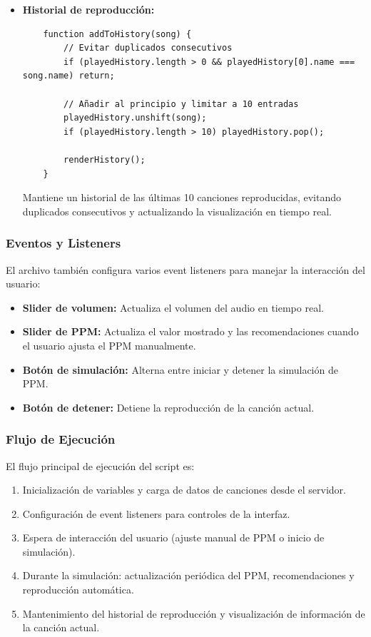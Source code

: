 \documentclass[a4paper,12pt]{article}
\begin{document}
\begin{itemize}
    \item \textbf{Historial de reproducción:}
    \begin{verbatim}
    function addToHistory(song) {
        // Evitar duplicados consecutivos
        if (playedHistory.length > 0 && playedHistory[0].name === song.name) return;
        
        // Añadir al principio y limitar a 10 entradas
        playedHistory.unshift(song);
        if (playedHistory.length > 10) playedHistory.pop();
        
        renderHistory();
    }
    \end{verbatim}
    Mantiene un historial de las últimas 10 canciones reproducidas, evitando duplicados consecutivos y actualizando la visualización en tiempo real.
\end{itemize}

\subsubsection{Eventos y Listeners}
El archivo también configura varios event listeners para manejar la interacción del usuario:

\begin{itemize}
    \item \textbf{Slider de volumen:} Actualiza el volumen del audio en tiempo real.
    \item \textbf{Slider de PPM:} Actualiza el valor mostrado y las recomendaciones cuando el usuario ajusta el PPM manualmente.
    \item \textbf{Botón de simulación:} Alterna entre iniciar y detener la simulación de PPM.
    \item \textbf{Botón de detener:} Detiene la reproducción de la canción actual.
\end{itemize}

\subsubsection{Flujo de Ejecución}
El flujo principal de ejecución del script es:

\begin{enumerate}
    \item Inicialización de variables y carga de datos de canciones desde el servidor.
    \item Configuración de event listeners para controles de la interfaz.
    \item Espera de interacción del usuario (ajuste manual de PPM o inicio de simulación).
    \item Durante la simulación: actualización periódica del PPM, recomendaciones y reproducción automática.
    \item Mantenimiento del historial de reproducción y visualización de información de la canción actual.
\end{enumerate}
\end{document}
